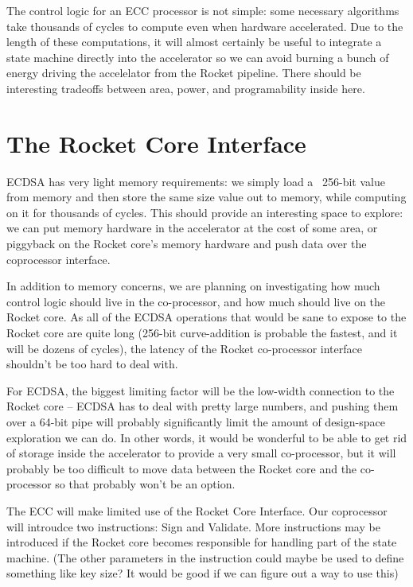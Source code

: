 \documentclass[twocolumn]{article}
\begin{document}
The control logic for an ECC processor is not simple: some necessary
algorithms take thousands of cycles\cite{mmm-hw_ecc} to compute even
when hardware accelerated.  Due to the length of these computations,
it will almost certainly be useful to integrate a state machine
directly into the accelerator so we can avoid burning a bunch of
energy driving the accelelator from the Rocket pipeline.  There should
be interesting tradeoffs between area, power, and programability
inside here.

\section{The Rocket Core Interface}

ECDSA has very light memory requirements: we simply load a ~256-bit
value from memory and then store the same size value out to memory,
while computing on it for thousands of cycles.  This should provide an
interesting space to explore: we can put memory hardware in the
accelerator at the cost of some area, or piggyback on the Rocket
core's memory hardware and push data over the coprocessor interface.

In addition to memory concerns, we are planning on investigating how
much control logic should live in the co-processor, and how much
should live on the Rocket core.  As all of the ECDSA operations that
would be sane to expose to the Rocket core are quite long (256-bit
curve-addition is probable the fastest, and it will be dozens of
cycles), the latency of the Rocket co-processor interface shouldn't be
too hard to deal with.

For ECDSA, the biggest limiting factor will be the low-width
connection to the Rocket core -- ECDSA has to deal with pretty large
numbers, and pushing them over a 64-bit pipe will probably
significantly limit the amount of design-space exploration we can do.
In other words, it would be wonderful to be able to get rid of storage
inside the accelerator to provide a very small co-processor, but it
will probably be too difficult to move data between the Rocket core
and the co-processor so that probably won't be an option.

The ECC will make limited use of the Rocket Core Interface. Our 
coprocessor will introudce two instructions: Sign and Validate. More
instructions may be introduced if the Rocket core becomes responsible
for handling part of the state machine. (The other 
parameters in the instruction could maybe be used to define something
like key size? It would be good if we can figure out a way to use this) 
\end{document}
